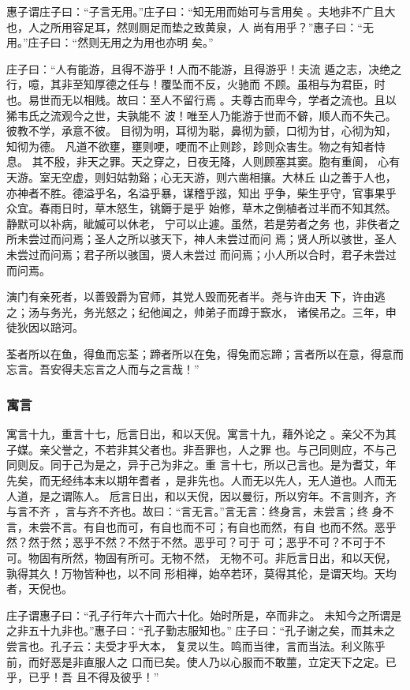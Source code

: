 \documentclass[]{article}
\begin{document}
惠子谓庄子曰：``子言无用。''庄子曰：``知无用而始可与言用矣
。夫地非不广且大也，人之所用容足耳，然则厕足而垫之致黄泉，人
尚有用乎？''惠子曰：``无用。''庄子曰：``然则无用之为用也亦明 矣。''

庄子曰：``人有能游，且得不游乎！人而不能游，且得游乎！夫流
遁之志，决绝之行，噫，其非至知厚德之任与！覆坠而不反，火驰而
不顾。虽相与为君臣，时也。易世而无以相贱。故曰：至人不留行焉
。夫尊古而卑今，学者之流也。且以狶韦氏之流观今之世，夫孰能不
波！唯至人乃能游于世而不僻，顺人而不失己。彼教不学，承意不彼。
目彻为明，耳彻为聪，鼻彻为颤，口彻为甘，心彻为知，知彻为德。
凡道不欲壅，壅则哽，哽而不止则跈，跈则众害生。物之有知者恃息。
其不殷，非天之罪。天之穿之，日夜无降，人则顾塞其窦。胞有重阆，
心有天游。室无空虚，则妇姑勃谿；心无天游，则六凿相攘。大林丘
山之善于人也，亦神者不胜。德溢乎名，名溢乎暴，谋稽乎誸，知出
乎争，柴生乎守，官事果乎众宜。春雨日时，草木怒生，铫鎒于是乎
始修，草木之倒植者过半而不知其然。静默可以补病，眦媙可以休老，
宁可以止遽。虽然，若是劳者之务
也，非佚者之所未尝过而问焉；圣人之所以骇天下，神人未尝过而问
焉；贤人所以骇世，圣人未尝过而问焉；君子所以骇国，贤人未尝过
而问焉；小人所以合时，君子未尝过而问焉。

演门有亲死者，以善毁爵为官师，其党人毁而死者半。尧与许由天
下，许由逃之；汤与务光，务光怒之；纪他闻之，帅弟子而蹲于窾水，
诸侯吊之。三年，申徒狄因以踣河。

荃者所以在鱼，得鱼而忘荃；蹄者所以在兔，得兔而忘蹄；言者所以在意，得意而忘言。吾安得夫忘言之人而与之言哉！''

\hypertarget{header-n940}{%
\subsubsection{寓言}\label{header-n940}}

寓言十九，重言十七，卮言日出，和以天倪。寓言十九，藉外论之
。亲父不为其子媒。亲父誉之，不若非其父者也。非吾罪也，人之罪
也。与己同则应，不与己同则反。同于己为是之，异于己为非之。重
言十七，所以己言也。是为耆艾，年先矣，而无经纬本末以期年耆者
，是非先也。人而无以先人，无人道也。人而无人道，是之谓陈人。
卮言日出，和以天倪，因以曼衍，所以穷年。不言则齐，齐与言不齐
，言与齐不齐也。故曰：``言无言。''言无言：终身言，未尝言；终
身不言，未尝不言。有自也而可，有自也而不可；有自也而然，有自
也而不然。恶乎然？然于然；恶乎不然？不然于不然。恶乎可？可于
可；恶乎不可？不可于不可。物固有所然，物固有所可。无物不然，
无物不可。非卮言日出，和以天倪，孰得其久！万物皆种也，以不同
形相禅，始卒若环，莫得其伦，是谓天均。天均者，天倪也。

庄子谓惠子曰：``孔子行年六十而六十化。始时所是，卒而非之。
未知今之所谓是之非五十九非也。''惠子曰：``孔子勤志服知也。''
庄子曰：``孔子谢之矣，而其未之尝言也。孔子云：夫受才乎大本，
复灵以生。鸣而当律，言而当法。利义陈乎前，而好恶是非直服人之
口而已矣。使人乃以心服而不敢蘁，立定天下之定。已乎，已乎！吾
且不得及彼乎！''
\end{document}
